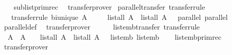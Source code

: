 \begin{isabellebody}
%
\isadelimproof
\ \ %
\endisadelimproof
%
\isatagproof
{}\isamarkupfalse%
\ sublist{\isacharunderscore}primrec\ \isamarkupfalse%
\ transfer{\isacharunderscore}prover%
\endisatagproof
{\isafoldproof}%
%
\isadelimproof
\isanewline
%
\endisadelimproof
\isanewline
{}\isamarkupfalse%
\ parallel{\isacharunderscore}transfer\ {\isacharbrackleft}transfer{\isacharunderscore}rule{\isacharbrackright}{\isacharcolon}\isanewline
\ \ \ {\isacharbrackleft}transfer{\isacharunderscore}rule{\isacharbrackright}{\isacharcolon}\ {\isachardoublequoteopen}bi{\isacharunderscore}unique\ A{\isachardoublequoteclose}\isanewline
\ \ \ \ \ {\isachardoublequoteopen}{\isacharparenleft}list{\isacharunderscore}all{}\ A\ {\isacharequal}{\isacharequal}{\isacharequal}{\isachargreater}\ list{\isacharunderscore}all{}\ A\ {\isacharequal}{\isacharequal}{\isacharequal}{\isachargreater}\ {\isacharparenleft}{\isacharequal}{\isacharparenright}{\isacharparenright}\ parallel\ parallel{\isachardoublequoteclose}\isanewline
%
\isadelimproof
\ \ %
\endisadelimproof
%
\isatagproof
{}\isamarkupfalse%
\ parallel{\isacharunderscore}def\ \isamarkupfalse%
\ transfer{\isacharunderscore}prover%
\endisatagproof
{\isafoldproof}%
%
\isadelimproof
\isanewline
%
\endisadelimproof
\ \ \ \ \isanewline
\isanewline
\isanewline
{}\isamarkupfalse%
\ list{\isacharunderscore}emb{\isacharunderscore}transfer\ {\isacharbrackleft}transfer{\isacharunderscore}rule{\isacharbrackright}{\isacharcolon}\isanewline
\ \ {\isachardoublequoteopen}{\isacharparenleft}{\isacharparenleft}A\ {\isacharequal}{\isacharequal}{\isacharequal}{\isachargreater}\ A\ {\isacharequal}{\isacharequal}{\isacharequal}{\isachargreater}\ {\isacharparenleft}{\isacharequal}{\isacharparenright}{\isacharparenright}\ {\isacharequal}{\isacharequal}{\isacharequal}{\isachargreater}\ list{\isacharunderscore}all{}\ A\ {\isacharequal}{\isacharequal}{\isacharequal}{\isachargreater}\ list{\isacharunderscore}all{}\ A\ {\isacharequal}{\isacharequal}{\isacharequal}{\isachargreater}\ {\isacharparenleft}{\isacharequal}{\isacharparenright}{\isacharparenright}\ list{\isacharunderscore}emb\ list{\isacharunderscore}emb{\isachardoublequoteclose}\isanewline
%
\isadelimproof
\ \ %
\endisadelimproof
%
\isatagproof
{}\isamarkupfalse%
\ list{\isacharunderscore}emb{\isacharunderscore}primrec\ \isamarkupfalse%
\ transfer{\isacharunderscore}prover%
\endisatagproof
{\isafoldproof}%

\end{isabellebody}
